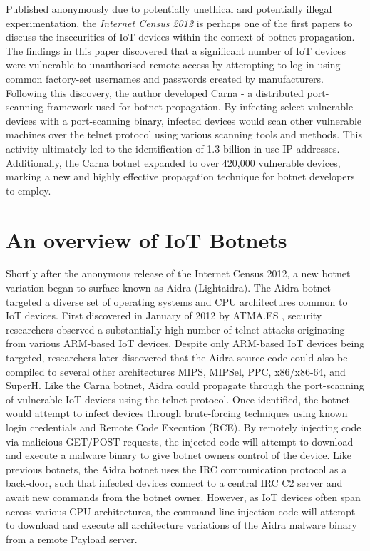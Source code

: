 Published anonymously due to potentially unethical and potentially illegal experimentation, the \textit{Internet Census 2012} \citep{Cencus2012} is perhaps one of the first papers to discuss the insecurities of IoT devices within the context of botnet propagation. The findings in this paper discovered that a significant number of IoT devices were vulnerable to unauthorised remote access by attempting to log in using common factory-set usernames and passwords created by manufacturers. Following this discovery, the author developed Carna - a distributed port-scanning framework used for botnet propagation. By infecting select vulnerable devices with a port-scanning binary, infected devices would scan other vulnerable machines over the telnet protocol using various scanning tools and methods. This activity ultimately led to the identification of 1.3 billion in-use IP addresses. Additionally, the Carna botnet expanded to over 420,000 vulnerable devices, marking a new and highly effective propagation technique for botnet developers to employ.




\section{An overview of IoT Botnets}

Shortly after the anonymous release of the Internet Census 2012, a new botnet variation began to surface known as Aidra (Lightaidra). \citep{AidraSource} The Aidra botnet targeted a diverse set of operating systems and CPU architectures common to IoT devices. First discovered in January of 2012 by ATMA.ES \citep{ATMA2012}, security researchers observed a substantially high number of telnet attacks originating from various ARM-based IoT devices. \citep{NJCCIC2016} Despite only ARM-based IoT devices being targeted, researchers later discovered that the Aidra source code could also be compiled to several other architectures MIPS, MIPSel, PPC, x86/x86-64, and SuperH. Like the Carna botnet, Aidra could propagate through the port-scanning of vulnerable IoT devices using the telnet protocol. Once identified, the botnet would attempt to infect devices through brute-forcing techniques using known login credentials and Remote Code Execution (RCE). By remotely injecting code via malicious GET/POST requests, the injected code will attempt to download and execute a malware binary to give botnet owners control of the device. Like previous botnets, the Aidra botnet uses the IRC communication protocol as a back-door, such that infected devices connect to a central IRC C2 server and await new commands from the botnet owner. However, as IoT devices often span across various CPU architectures, the command-line injection code will attempt to download and execute all architecture variations of the Aidra malware binary from a remote Payload server.

